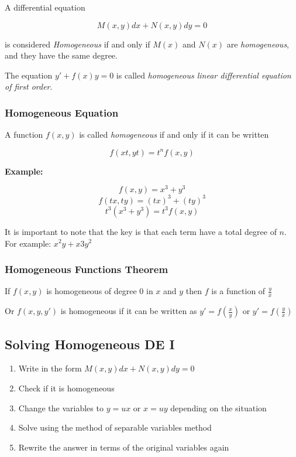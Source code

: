 A differential equation 

\[
    M(x,y)dx + N(x,y)dy = 0
\]

is considered \emph{Homogeneous} if and only if
\(M(x)\) and \(N(x)\) are \emph{homogeneous}, and they have the same degree.

The equation \(y' + f(x)y = 0\) is called \emph{homogeneous linear differential equation of first order}.

\subsubsection{Homogeneous Equation}

A function \(f(x,y)\) is called \emph{homogeneous} if and only if it can be written

\[
    f(xt, yt) = t^n f(x,y)
\]

\textbf{Example: }

\[
    f(x,y) = x^3 + y^3
\]
\[
    f(tx, ty) = {(tx)}^3 + {(ty)}^3
\]
\[
    t^3 (x^3 + y^3) = t^3 f(x,y)
\]

It is important to note that the key is that each term have a total degree of \(n\).
For example: \(x^2y + x3y^2\)

\subsubsection{Homogeneous Functions Theorem}

If \(f(x,y)\) is homogeneous of degree \(0\) in \(x\) and \(y\) then 
\(f\) is a function of \(\frac{y}{x}\)

Or \(f(x,y,y')\) is homogeneous if it can be written as \(y' = f(\frac{x}{y})\) or \(y' = f(\frac{y}{x})\)

\subsection{Solving Homogeneous DE I}

\begin{enumerate}
    \item Write in the form \(M(x,y)dx + N(x,y)dy = 0\)
    \item Check if it is homogeneous
    \item Change the variables to \(y = ux\) or \(x = uy\) depending on the situation
    \item Solve using the method of separable variables method
    \item Rewrite the answer in terms of the original variables again
\end{enumerate}

